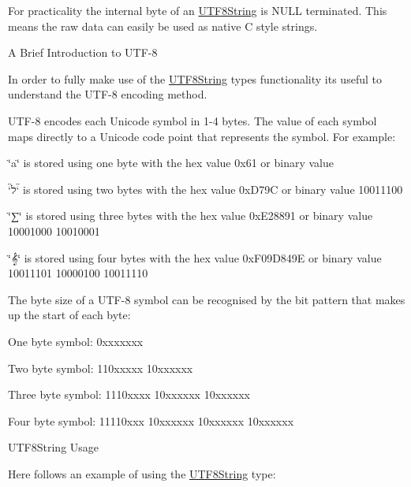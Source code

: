 For practicality the internal byte of an \hyperlink{classchaos_1_1uni_1_1_u_t_f8_string}{U\+T\+F8\+String} is N\+U\+L\+L terminated. This means the raw data can easily be used as native C style strings.

\begin{DoxyParagraph}{A Brief Introduction to U\+T\+F-\/8}

\end{DoxyParagraph}
In order to fully make use of the \hyperlink{classchaos_1_1uni_1_1_u_t_f8_string}{U\+T\+F8\+String} type\textquotesingle{}s functionality its useful to understand the U\+T\+F-\/8 encoding method.

U\+T\+F-\/8 encodes each Unicode symbol in 1-\/4 bytes. The value of each symbol maps directly to a Unicode code point that represents the symbol. For example\+:


\begin{DoxyItemize}
\item \char`\"{}a\char`\"{} is stored using one byte with the hex value 0x61 or binary value {}
\item \char`\"{}ל\char`\"{} is stored using two bytes with the hex value 0x\+D79\+C or binary value { 10011100}
\item \char`\"{}∑\char`\"{} is stored using three bytes with the hex value 0x\+E28891 or binary value { 10001000 10010001}
\item \char`\"{}𝄞\char`\"{} is stored using four bytes with the hex value 0x\+F09\+D849\+E or binary value { 10011101 10000100 10011110}
\end{DoxyItemize}

The byte size of a U\+T\+F-\/8 symbol can be recognised by the bit pattern that makes up the start of each byte\+:


\begin{DoxyItemize}
\item One byte symbol\+: {\ttfamily 0xxxxxxx}
\item Two byte symbol\+: {\ttfamily 110xxxxx 10xxxxxx}
\item Three byte symbol\+: {\ttfamily 1110xxxx 10xxxxxx 10xxxxxx}
\item Four byte symbol\+: {\ttfamily 11110xxx 10xxxxxx 10xxxxxx 10xxxxxx}
\end{DoxyItemize}

\begin{DoxyParagraph}{U\+T\+F8\+String Usage}

\end{DoxyParagraph}
Here follows an example of using the \hyperlink{classchaos_1_1uni_1_1_u_t_f8_string}{U\+T\+F8\+String} type\+:

